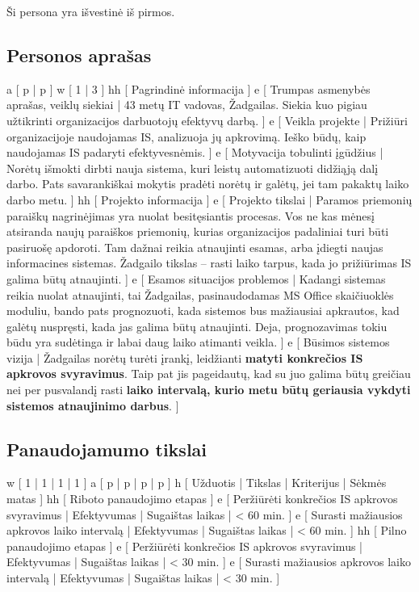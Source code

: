 ﻿Ši persona yra išvestinė iš pirmos.
\subsection{Personos aprašas}
\xtableu
{
  a [ p | p ]
  w [ 1 | 3 ]
  hh [ Pagrindinė informacija ]
  e [ Trumpas asmenybės aprašas, veiklų siekiai 
  | 
    43 metų IT vadovas, Žadgailas. Siekia kuo pigiau užtikrinti
    organizacijos darbuotojų efektyvų darbą.
  ]
  e [ Veikla projekte 
  | 
    Prižiūri organizacijoje naudojamas IS, analizuoja jų apkrovimą.
    Ieško būdų, kaip naudojamas IS padaryti efektyvesnėmis.
  ]
  e [ Motyvacija tobulinti įgūdžius 
  |
    Norėtų išmokti dirbti nauja sistema, kuri leistų automatizuoti
    didžiąją dalį darbo. Pats savarankiškai mokytis pradėti
    norėtų ir galėtų, jei tam pakaktų laiko darbo metu.
  ]
  hh [ Projekto informacija ]
  e [ Projekto tikslai 
  | 
    Paramos priemonių paraiškų nagrinėjimas yra nuolat
    besitęsiantis procesas. Vos ne kas mėnesį atsiranda naujų
    paraiškos priemonių, kurias organizacijos padaliniai turi būti
    pasiruošę apdoroti. Tam dažnai reikia atnaujinti esamas, arba
    įdiegti naujas informacines sistemas. Žadgailo tikslas – rasti
    laiko tarpus, kada jo prižiūrimas IS galima būtų atnaujinti.
  ]
  e [ Esamos situacijos problemos 
  | 
    Kadangi sistemas reikia nuolat atnaujinti, tai Žadgailas,
    pasinaudodamas MS Office skaičiuoklės moduliu, bando pats
    prognozuoti, kada sistemos bus mažiausiai apkrautos, kad galėtų
    nuspręsti, kada jas galima būtų atnaujinti. Deja, prognozavimas
    tokiu būdu yra sudėtinga ir labai daug laiko atimanti veikla.
  ]
  e [ Būsimos sistemos vizija 
  | 
    Žadgailas norėtų turėti įrankį, leidžianti \textbf{matyti konkrečios
    IS apkrovos svyravimus}. Taip pat jis pageidautų, kad su juo
    galima būtų greičiau nei per pusvalandį rasti \textbf{laiko intervalą,
    kurio metu būtų geriausia vykdyti sistemos atnaujinimo darbus}.
  ]
}

\subsection{Panaudojamumo tikslai}
\xtable
{
  w [ 1 | 1 | 1 | 1 ]
  a [ p | p | p | p ]
  h [ Užduotis | Tikslas | Kriterijus | Sėkmės matas ]
  hh [ Riboto panaudojimo etapas ]
  e [ Peržiūrėti konkrečios IS apkrovos svyravimus | Efektyvumas | Sugaištas laikas | < 60 min. ]
  e [ Surasti mažiausios apkrovos laiko intervalą | Efektyvumas | Sugaištas laikas | < 60 min. ]
  hh [ Pilno panaudojimo etapas ]
  e [ Peržiūrėti konkrečios IS apkrovos svyravimus | Efektyvumas | Sugaištas laikas | < 30 min. ]
  e [ Surasti mažiausios apkrovos laiko intervalą | Efektyvumas | Sugaištas laikas | < 30 min. ]
}
